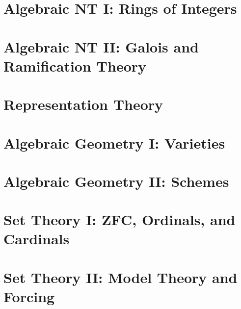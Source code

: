 \documentclass[11pt,twoside=semi,openright,numbers=noenddot]{scrreprt}
\begin{document}
\part{Algebraic NT I: Rings of Integers}






\part{Algebraic NT II: Galois and Ramification Theory}





\part{Representation Theory}





\part{Algebraic Geometry I: Varieties}





\part{Algebraic Geometry II: Schemes}






\part{Set Theory I: ZFC, Ordinals, and Cardinals}





\part{Set Theory II: Model Theory and Forcing}



\end{document}
